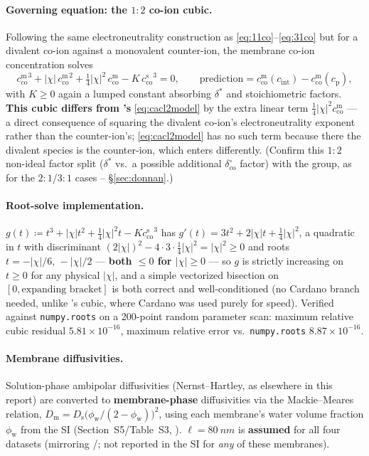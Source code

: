\documentclass[11pt]{article}
\newcommand{\note}[1]{{\color{blue}\textsf{(#1)}}}
\newcommand{\cm}[1]{{c^{\mathrm{m}}_{#1}}}
\newcommand{\cs}[1]{{c^{\mathrm{s}}_{#1}}}
\newcommand{\co}{\mathrm{co}}
\newcommand{\dstar}{\delta^{*}}
\newcommand{\cint}{c_{\mathrm{int}}}
\newcommand{\cp}{c_{\mathrm{p}}}
\begin{document}
\paragraph{Governing equation: the $1{:}2$ co-ion cubic.} Following the same
electroneutrality construction as \eqref{eq:11co}--\eqref{eq:31co} but for a
divalent co-ion against a monovalent counter-ion, the membrane co-ion
concentration solves
\begin{equation}
  \cm{\co}^3 + |\chi|\,\cm{\co}^2 + \tfrac14|\chi|^2\,\cm{\co} - K\,\cs{\co}^3 = 0,
  \qquad \text{prediction} = \cm{\co}(\cint) - \cm{\co}(\cp),
  \label{eq:na2so4model}
\end{equation}
with $K\ge0$ again a lumped constant absorbing $\dstar$ and stoichiometric
factors. \textbf{This cubic differs from 's} \eqref{eq:cacl2model}
by the extra linear term $\tfrac14|\chi|^2\cm{\co}$ --- a direct consequence
of squaring the divalent co-ion's electroneutrality exponent rather than the
counter-ion's; \eqref{eq:cacl2model} has no such term because there the
divalent species is the counter-ion, which enters differently. \note{Confirm
this $1{:}2$ non-ideal factor split ($\dstar$ vs.\ a possible additional
$\delta^{\circ}_{\co}$ factor) with the group, as for the $2{:}1$/$3{:}1$
cases -- \S\ref{sec:donnan}.}

\paragraph{Root-solve implementation.} $g(t) \coloneqq t^3+|\chi|t^2+
\tfrac14|\chi|^2 t - K\cs{\co}^3$ has $g'(t)=3t^2+2|\chi|t+\tfrac14|\chi|^2$,
a quadratic in $t$ with discriminant $(2|\chi|)^2-4\cdot3\cdot\tfrac14|\chi|^2
=|\chi|^2\ge0$ and roots $t=-|\chi|/6,\,-|\chi|/2$ --- \textbf{both $\le0$ for
$|\chi|\ge0$} --- so $g$ is strictly increasing on $t\ge0$ for any physical
$|\chi|$, and a simple vectorized bisection on $[0,\text{expanding bracket}]$
is both correct and well-conditioned (no Cardano branch needed, unlike
's cubic, where Cardano was used purely for speed). Verified
against \texttt{numpy.roots} on a 200-point random parameter scan: maximum
relative cubic residual $5.81\times10^{-16}$, maximum relative error vs.\
\texttt{numpy.roots} $8.87\times10^{-16}$.

\paragraph{Membrane diffusivities.} Solution-phase ambipolar diffusivities
(Nernst--Hartley, as elsewhere in this report) are converted to
\textbf{membrane-phase} diffusivities via the Mackie--Meares relation,
$D_{\mathrm m}=D_{\mathrm s}\big(\phi_{\mathrm w}/(2-\phi_{\mathrm w})\big)^2$,
using each membrane's water volume fraction $\phi_{\mathrm w}$ from the SI
(Section~S5/Table~S3, \cite{estrada2026spacerarm}). $\ell=\SI{80}{nm}$ is
\textbf{assumed} for all four datasets (mirroring \ce{CaCl2}/\ce{LaCl3}; not
reported in the SI for \emph{any} of these membranes).
\end{document}
